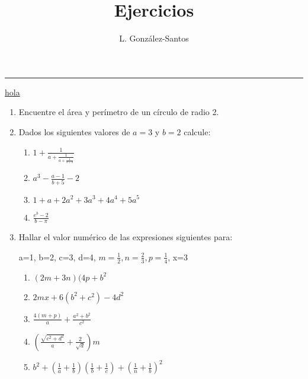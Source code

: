 \documentclass[a4paper]{article}
\title{Ejercicios}
\author{L. González-Santos}
\begin{document}
\maketitle

\hrule

\href{https://www.unam.mx}{hola}



\begin{enumerate}
\item Encuentre el área y perímetro de un  círculo de radio 2.
\item Dados los siguientes valores de $a=3$ y $b=2$ calcule:

\begin{enumerate}
\item $1+ \frac{1}{a+\frac{1}{a+\frac{1}{a+b}}}$
\item $a^3-\frac{a-1}{b+5}-2$
\item $1+a+2a^2+3a^3+ 4a^4 + 5a^5$
\item $\frac{e^b-2}{b-\pi}$
\end{enumerate}

\item Hallar el valor numérico de las expresiones siguientes para:

a=1, b=2, c=3, d=4, $m=\frac{1}{2}, n=\frac{2}{3}, p=\frac{1}{4}$, x=3

\begin{enumerate}
\item $(2m+3n)(4p + b^2$
\item $2mx + 6(b^2 + c^2) - 4d^2$
\item $\frac{4(m+p)}{a} + \frac{a^2+b^2}{c^2}$
\item $(\frac{\sqrt{c^2+d^2}}{a} + \frac{2}{\sqrt{d}})m$
\item $b^2+(\frac{1}{a}+ \frac{1}{b})(\frac{1}{b}+ \frac{1}{c}) + (\frac{1}{n}+ \frac{1}{b})^2$
\end{enumerate}
\end{enumerate}  
\end{document}
